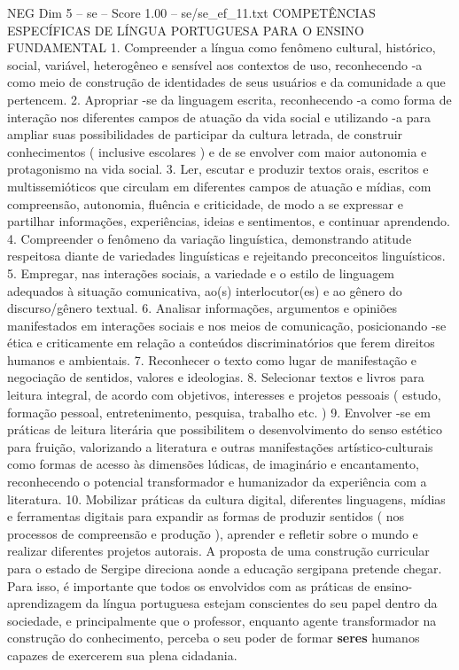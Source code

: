 \begin{textsample}{NEG Dim 5 – se – Score 1.00 – se/se\_ef\_11.txt}  \label{ex:f5_neg_158}
COMPETÊNCIAS ESPECÍFICAS DE LÍNGUA PORTUGUESA PARA O ENSINO FUNDAMENTAL 1.
Compreender a língua como fenômeno cultural, histórico, social, variável, heterogêneo e sensível aos contextos de uso, reconhecendo -a como meio de construção de identidades de seus usuários e da comunidade a que pertencem. 2.
Apropriar -se da linguagem escrita, reconhecendo -a como forma de interação nos diferentes campos de atuação da vida social e utilizando -a para ampliar suas possibilidades de participar da cultura letrada, de construir conhecimentos ( inclusive escolares ) e de se envolver com maior autonomia e protagonismo na vida social. 3.
Ler, escutar e produzir textos orais, escritos e multissemióticos que circulam em diferentes campos de atuação e mídias, com compreensão, autonomia, fluência e criticidade, de modo a se expressar e partilhar informações, experiências, ideias e sentimentos, e continuar aprendendo. 4.
Compreender o fenômeno da variação linguística, demonstrando atitude respeitosa diante de variedades linguísticas e rejeitando preconceitos linguísticos. 5.
Empregar, nas interações sociais, a variedade e o estilo de linguagem adequados à situação comunicativa, ao(s) interlocutor(es) e ao gênero do discurso/gênero textual. 6.
Analisar informações, argumentos e opiniões manifestados em interações sociais e nos meios de comunicação, posicionando -se ética e criticamente em relação a conteúdos discriminatórios que ferem direitos humanos e ambientais. 7.
Reconhecer o texto como lugar de manifestação e negociação de sentidos, valores e ideologias. 8.
Selecionar textos e livros para leitura integral, de acordo com objetivos, interesses e projetos pessoais ( estudo, formação pessoal, entretenimento, pesquisa, trabalho etc. ) 9.
Envolver -se em práticas de leitura literária que possibilitem o desenvolvimento do senso estético para fruição, valorizando a literatura e outras manifestações artístico-culturais como formas de acesso às dimensões lúdicas, de imaginário e encantamento, reconhecendo o potencial transformador e humanizador da experiência com a literatura. 10.
Mobilizar práticas da cultura digital, diferentes linguagens, mídias e ferramentas digitais para expandir as formas de produzir sentidos ( nos processos de compreensão e produção ), aprender e refletir sobre o mundo e realizar diferentes projetos autorais.
A proposta de uma construção curricular para o estado de Sergipe direciona aonde a educação sergipana pretende chegar.
Para isso, é importante que todos os envolvidos com as práticas de ensino-aprendizagem da língua portuguesa estejam conscientes do seu papel dentro da sociedade, e principalmente que o professor, enquanto agente transformador na construção do conhecimento, perceba o seu poder de formar \textbf{seres} humanos capazes de exercerem sua plena cidadania.

\end{textsample}
